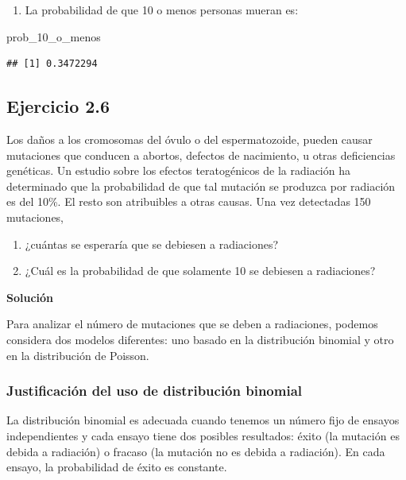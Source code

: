 \documentclass[
]{article}
\newenvironment{Shaded}{\begin{snugshade}}{\end{snugshade}}
\newcommand{\NormalTok}[1]{#1}
\providecommand{\tightlist}{%
  \setlength{\itemsep}{0pt}\setlength{\parskip}{0pt}}
\begin{document}
\begin{enumerate}
\def\labelenumi{\arabic{enumi}.}
\setcounter{enumi}{2}
\tightlist
\item
  La probabilidad de que 10 o menos personas mueran es:
\end{enumerate}

\begin{Shaded}
\begin{Highlighting}[]
\NormalTok{prob\_10\_o\_menos}
\end{Highlighting}
\end{Shaded}

\begin{verbatim}
## [1] 0.3472294
\end{verbatim}

\subsection{Ejercicio 2.6}\label{ejercicio-2.6}

Los daños a los cromosomas del óvulo o del espermatozoide, pueden causar mutaciones que conducen a abortos, defectos de nacimiento, u otras deficiencias genéticas. Un estudio sobre los efectos teratogénicos de la radiación ha determinado que la probabilidad de que tal mutación se produzca por radiación es del 10\%. El resto son atribuibles a otras causas.
Una vez detectadas 150 mutaciones,

\begin{enumerate}
\def\labelenumi{\arabic{enumi}.}
\tightlist
\item
  ¿cuántas se esperaría que se debiesen a radiaciones?
\item
  ¿Cuál es la probabilidad de que solamente 10 se debiesen a radiaciones?
\end{enumerate}

\textbf{Solución}

Para analizar el número de mutaciones que se deben a radiaciones, podemos considera dos modelos diferentes: uno basado en la distribución binomial y otro en la distribución de Poisson.

\subsubsection{Justificación del uso de distribución binomial}\label{justificaciuxf3n-del-uso-de-distribuciuxf3n-binomial}

La distribución binomial es adecuada cuando tenemos un número fijo de ensayos independientes y cada ensayo tiene dos posibles resultados: éxito (la mutación es debida a radiación) o fracaso (la mutación no es debida a radiación). En cada ensayo, la probabilidad de éxito es constante.
\end{document}
